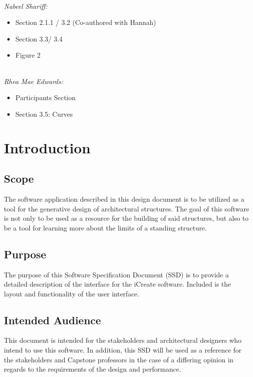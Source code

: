 \documentclass[draftclsnofoot,onecolumn,compsoc]{IEEEtran}
\begin{document}
~ \\
\textit{Nabeel Shariff:}
	\begin{itemize}
		\item Section 2.1.1 /  3.2 (Co-authored with Hannah)
        \item Section 3.3/ 3.4 
        \item Figure 2
	\end{itemize}
    
~ \\
\textit{Rhea Mae Edwards:}
	\begin{itemize}
		\item Participants Section
        \item Section 3.5: Curves
	\end{itemize}

\newpage


\section{Introduction}

\subsection{Scope}
The software application described in this design document is to be utilized as a tool for the generative design of architectural structures. The goal of this software is not only to be used as a resource for the building of said structures, but also to be a tool for learning more about the limits of a standing structure.

\subsection{Purpose}
    The purpose of this Software Specification Document (SSD) is to provide a detailed description of the interface for the iCreate software. Included is the layout and functionality of the user interface.

\subsection{Intended Audience}
This document is intended for the stakeholders and architectural designers who intend to use this software. In addition, this SSD will be used as a reference for the stakeholders and Capstone professors in the case of a differing opinion in regards to the requirements of the design and performance.
\end{document}
